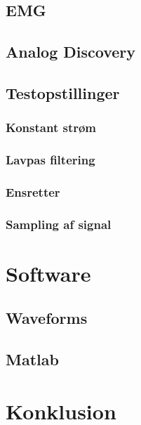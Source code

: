 \documentclass[main.tex]{subfiles}
\begin{document}
\section{EMG}
\section{Analog Discovery}
\section{Testopstillinger}
\subsection{Konstant strøm}
\subsection{Lavpas filtering}
\subsection{Ensretter}
\subsection{Sampling af signal}




\chapter{Software}
\section{Waveforms}
\section{Matlab}

\chapter{Konklusion}


\end{document}
